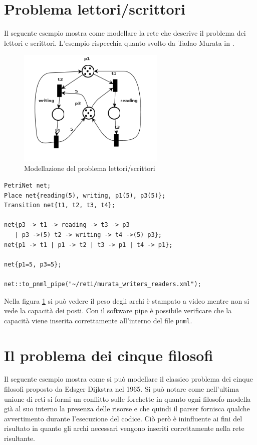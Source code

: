 \documentclass[italian,12pt]{book}
\begin{document}
\section{Problema lettori/scrittori}
Il seguente esempio mostra come modellare la rete che descrive il problema dei lettori e scrittori. L'esempio rispecchia quanto svolto da Tadao Murata in \cite{MURATA}.

\begin{figure}[htb]
\centerline{\includegraphics[width=7cm]{img/murata_writers_readers.png}}
\caption{Modellazione del problema lettori/scrittori}\label{fig:let_scrit.png}
\end{figure}

\begin{verbatim}PetriNet net;
Place net{reading(5), writing, p1(5), p3(5)};
Transition net{t1, t2, t3, t4};

net{p3 -> t1 -> reading -> t3 -> p3 
   | p3 ->(5) t2 -> writing -> t4 ->(5) p3};
net{p1 -> t1 | p1 -> t2 | t3 -> p1 | t4 -> p1};

net{p1=5, p3=5};

net::to_pnml_pipe("~/reti/murata_writers_readers.xml");
\end{verbatim}

Nella figura \ref{fig:let_scrit.png} si può vedere il peso degli archi è stampato a video mentre non si vede la capacità dei posti. Con il software pipe è possibile verificare che la capacità viene inserita correttamente all'interno del file {\tt pnml}.

\section{Il problema dei cinque filosofi}
Il seguente esempio mostra come si può modellare il classico problema
dei cinque filosofi proposto da Edsger Dijkstra nel 1965. Si può
notare come nell'ultima unione di reti si formi un conflitto sulle
forchette in quanto ogni filosofo modella già al suo interno la
presenza delle risorse e che quindi il parser fornisca qualche
avvertimento durante l'esecuzione del codice. Ciò però è ininfluente
ai fini del risultato in quanto gli archi necessari vengono inseriti
correttamente nella rete risultante.
\end{document}
